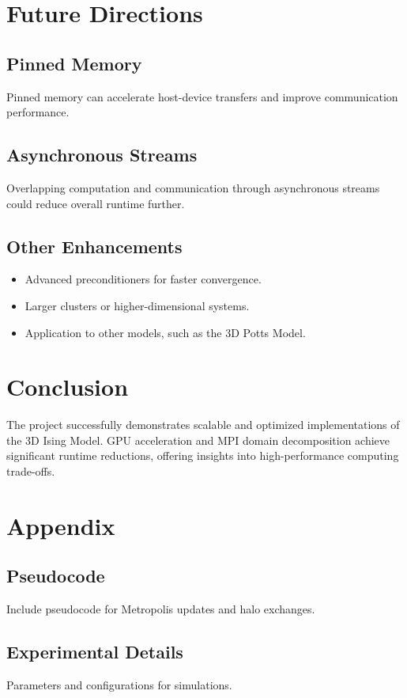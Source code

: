 \documentclass{article}
\begin{document}
\section{Future Directions}
\subsection{Pinned Memory}
Pinned memory can accelerate host-device transfers and improve communication performance.

\subsection{Asynchronous Streams}
Overlapping computation and communication through asynchronous streams could reduce overall runtime further.

\subsection{Other Enhancements}
\begin{itemize}
    \item Advanced preconditioners for faster convergence.
    \item Larger clusters or higher-dimensional systems.
    \item Application to other models, such as the 3D Potts Model.
\end{itemize}

\section{Conclusion}
The project successfully demonstrates scalable and optimized implementations of the 3D Ising Model. GPU acceleration and MPI domain decomposition achieve significant runtime reductions, offering insights into high-performance computing trade-offs.

\appendix
\section{Appendix}
\subsection{Pseudocode}
Include pseudocode for Metropolis updates and halo exchanges.

\subsection{Experimental Details}
Parameters and configurations for simulations.
\end{document}
